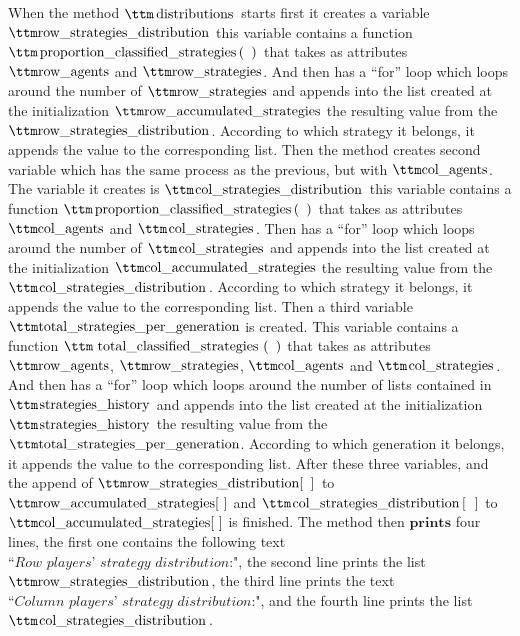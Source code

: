 When the method $\pythoninline{distributions}$ starts first it creates a variable $\pythoninline{row\_strategies\_distribution}$ this variable contains a function $\pythoninline{proportion\_classified\_strategies( )}$ that takes as attributes $\pythoninline{row\_agents}$ and $\pythoninline{row\_strategies}$. And then has a ``for'' loop which loops around the number of  $\pythoninline{row\_strategies}$ and appends into the list created at the initialization $\pythoninline{row\_accumulated\_strategies}$ the resulting value from the $\pythoninline{row\_strategies\_distribution}$. According to which strategy it belongs, it appends the value to the corresponding list. 
Then the method creates second variable which has the same process as the previous, but with $\pythoninline{col\_agents}$. The variable it creates is $\pythoninline{col\_strategies\_distribution}$ this variable contains a function $\pythoninline{proportion\_classified\_strategies( )}$ that takes as attributes $\pythoninline{col\_agents}$ and $\pythoninline{col\_strategies}$. Then has a ``for'' loop which loops around the number of  $\pythoninline{col\_strategies}$ and appends into the list created at the initialization $\pythoninline{col\_accumulated\_strategies}$ the resulting value from the $\pythoninline{col\_strategies\_distribution}$. According to which strategy it belongs, it appends the value to the corresponding list.  Then a third variable  $\pythoninline{total\_strategies\_per\_generation}$ is created. This variable contains a function $\pythoninline{total\_classified\_strategies( )}$ that takes as attributes $\pythoninline{row\_agents}$, $\pythoninline{row\_strategies}$, $\pythoninline{col\_agents}$ and $\pythoninline{col\_strategies}$. And then has a ``for'' loop which loops around the number of lists contained in  $\pythoninline{strategies\_history}$ and appends into the list created at the initialization $\pythoninline{strategies\_history}$ the resulting value from the $\pythoninline{total\_strategies\_per\_generation}$. According to which generation it belongs, it appends the value to the corresponding list. After these three variables, and the append of $\pythoninline{row\_strategies\_distribution[  ]}$ to $\pythoninline{row\_accumulated\_strategies[  ]}$ and $\pythoninline{col\_strategies\_distribution[  ]}$ to $\pythoninline{col\_accumulated\_strategies[  ]}$ is finished. The method then $\textbf{prints}$ four lines, the first one contains the following text $\textit{``Row players' strategy distribution:"}$, the second line prints the list $\pythoninline{row\_strategies\_distribution}$, the third line prints the text $\textit{``Column players' strategy distribution:"}$, and the fourth line prints the list $\pythoninline{col\_strategies\_distribution}$. 
